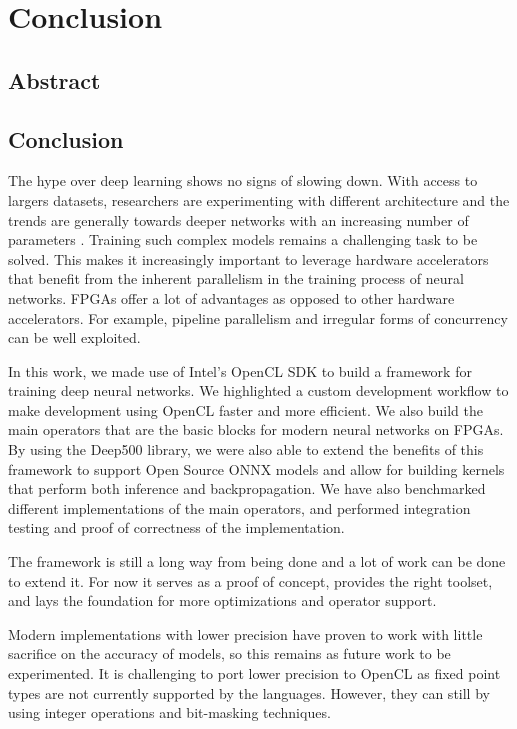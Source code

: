 
\chapter{Conclusion} %

\label{Chapter6} %


\section{Abstract}


\section{Conclusion}

The hype over deep learning shows no signs of slowing down. With access to largers datasets, researchers are experimenting with different architecture and the trends are generally towards deeper networks with an increasing number of parameters \citep{ddl}. Training such complex models remains a challenging task to be solved. This makes it increasingly important to leverage hardware accelerators that benefit from the inherent parallelism in the training process of neural networks. FPGAs offer a lot of advantages as opposed to other hardware accelerators. For example, pipeline parallelism and irregular forms of concurrency can be well exploited.

In this work, we made use of Intel's OpenCL SDK to build a framework for training deep neural networks. We highlighted a custom development workflow to make development using OpenCL faster and more efficient. We also build the main operators that are the basic blocks for modern neural networks on FPGAs. By using the Deep500 library, we were also able to extend the benefits of this framework to support Open Source ONNX models and allow for building kernels that perform both inference and backpropagation. We have also benchmarked different implementations of the main operators, and performed integration testing and proof of correctness of the implementation. 

The framework is still a long way from being done and a lot of work can be done to extend it. For now it serves as a proof of concept, provides the right toolset, and lays the foundation for more optimizations and operator support.

Modern implementations with lower precision have proven to work with little sacrifice on the accuracy of models, so this remains as future work to be experimented. It is challenging to port lower precision to OpenCL as fixed point types are not currently supported by the languages. However, they can still by using integer operations and bit-masking techniques. 




